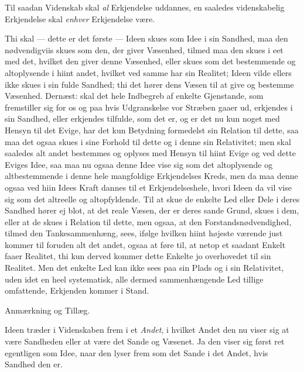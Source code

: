 \documentclass[12pt,a4paper]{book}
\newcommand{\apage}[1]{\marginnote{\footnotesize\textit{[#1]}}}
\begin{document}
Til saadan Videnskab skal \emph{al} Erkjendelse uddannes, en saaledes
videnskabelig Erkjendelse skal \emph{enhver} Erkjendelse være.

Thi skal --- dette er det første --- Ideen skues som Idee i sin Sandhed, maa den
nødvendigviis skues som den, der giver Væsenhed, tilmed maa den skues i eet med
det, hvilket den giver denne Væsenhed, eller skues som det bestemmende og
altoplysende i hiint andet, hvilket ved samme har sin Realitet; Ideen vilde
ellers ikke skues i sin fulde Sandhed; thi det hører dens Væsen til at give og
bestemme Væsenhed. Dernæst: skal det hele Indbegreb af enkelte Gjenstande, som
fremstiller sig for os og paa hvis Udgranskelse vor Stræben gaaer ud, erkjendes i
sin Sandhed, eller erkjendes tilfulde, som det er, og er det nu kun noget med
Hensyn til det Evige, har det kun Betydning formedelst sin Relation til dette, saa
maa det ogsaa skues i sine Forhold til dette og i denne sin Relativitet; men skal
saaledes alt andet bestemmes og oplyses med Hensyn til hiint Evige og ved dette
Eviges Idee, saa maa nu ogsaa denne Idee vise \apage{118} sig som det altoplysende og
altbestemmende i denne hele mangfoldige Erkjendelses Kreds, men da maa denne ogsaa
ved hiin Idees Kraft dannes til et Erkjendelseshele, hvori Ideen da vil vise sig
som det altreelle og altopfyldende. Til at skue de enkelte Led eller Dele i deres
Sandhed hører ej blot, at det reale Væsen, der er deres sande Grund, skues i dem,
eller at de skues i Relation til dette, men ogsaa, at den Forstandsnødvendighed,
tilmed den Tankesammenhæng, sees, ifølge hvilken hiint højeste værende just
kommer til foruden alt det andet, ogsaa at føre til, at netop et saadant Enkelt
faaer Realitet, thi kun derved kommer dette Enkelte jo overhovedet til sin
Realitet. Men det enkelte Led kan ikke sees paa sin Plads og i sin Relativitet,
uden idet en heel systematisk, alle dermed sammenhængende Led tillige omfattende,
Erkjenden kommer i Stand.

\begin{center}Anmærkning og Tillæg.\end{center}

Ideen træder i Videnskaben frem i et \emph{Andet}, i hvilket Andet den nu viser
sig at være Sandheden eller at være det Sande og Væsenet. Ja den viser sig først
ret egentligen som Idee, naar den lyser frem som det Sande i det Andet, hvis
Sandhed den er.
\end{document}
